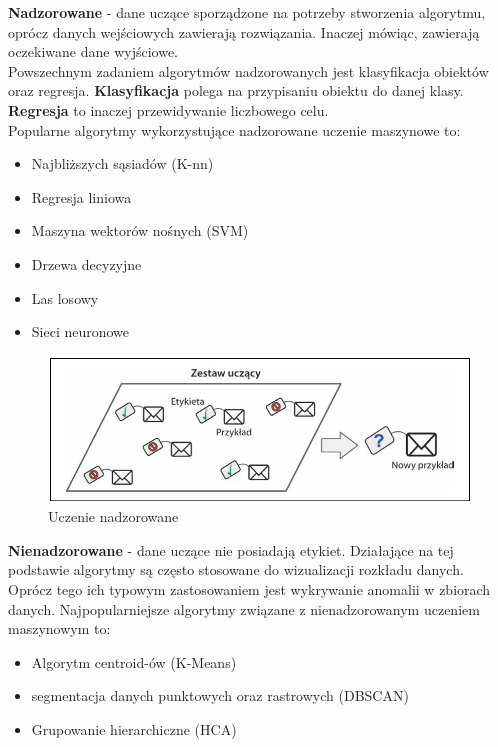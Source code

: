 \begin{description}
\item \textbf{Nadzorowane} - dane uczące sporządzone na potrzeby stworzenia algorytmu, oprócz danych wejściowych zawierają rozwiązania. Inaczej mówiąc, zawierają oczekiwane dane wyjściowe.\\Powszechnym zadaniem algorytmów nadzorowanych jest klasyfikacja obiektów oraz regresja. \textbf{Klasyfikacja} polega na przypisaniu obiektu do danej klasy. \textbf{Regresja} to inaczej przewidywanie liczbowego celu.\\ Popularne algorytmy wykorzystujące nadzorowane uczenie maszynowe to:
    \begin{itemize}
        \item Najbliższych sąsiadów (K-nn)
        \item Regresja liniowa
        \item Maszyna wektorów nośnych (SVM)
        \item Drzewa decyzyjne
        \item Las losowy
        \item Sieci neuronowe
    \end{itemize}
    
    \begin{figure}[h!]
    \begin{center}
        \includegraphics[scale=0.75]{img/oreily.png}
        \caption{Uczenie nadzorowane \cite{oreilly}}
        \label{fig:nadzorowane}    
    \end{center}
    
\end{figure}
\item \textbf{Nienadzorowane} - dane uczące nie posiadają etykiet. Działające na tej podstawie algorytmy są często stosowane do wizualizacji rozkładu danych. Oprócz tego ich typowym zastosowaniem jest wykrywanie anomalii w zbiorach danych. Najpopularniejsze algorytmy związane z nienadzorowanym uczeniem maszynowym to:
    \begin{itemize}
        \item Algorytm centroid-ów (K-Means)
        \item segmentacja danych punktowych oraz rastrowych (DBSCAN)
        \item Grupowanie hierarchiczne (HCA)
    \end{itemize}
    

\end{description}
